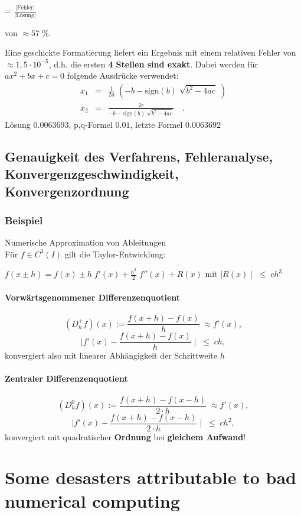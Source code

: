 { = $\frac{|\mbox{Fehler}|}{|\mbox{Lösung}|}$}

von        $\approx 57 \; \%$.

Eine geschickte Formatierung liefert ein Ergebnis mit einem
relativen Fehler von $\approx 1,5 \cdot 10^{-5}$,
d.h. die ersten \textbf{4 Stellen sind exakt}. 
Dabei werden für $ax^2 + bx + c = 0$ folgende Ausdrücke verwendet:
\begin{align*}
  x_1 &=& \tfrac{1}{2a} \; (- b - \mbox{sign}(b) \; \sqrt{b^2 -
          4ac}\;)\\
  x_2& =  &\tfrac{2c}{- b - \mbox{sign}(b) \; \sqrt{b^2 - 4ac}} \quad .
\end{align*}
Lösung $0.0063693$, p,q-Formel $0.01$,
letzte Formel $0.0063692$

\subsection*{Genauigkeit des Verfahrens, Fehleranalyse,
  Konvergenzgeschwindigkeit, Konvergenzordnung}

\subsubsection{Beispiel}
Numerische Approximation von Ableitungen \\
Für $f \in C^3(I)$ gilt die Taylor-Entwicklung:

$f(x \pm h) = f(x) \pm h \; f'(x) + \frac{h^2}{2} \; f''(x) +
R(x)$ mit $\mid R(x) \mid \; \leq \; c   h^3$

\paragraph{Vorwärtsgenommener Differenzenquotient}
$$ (D_h^+f)(x):= \frac{f(x + h) - f(x)}{h} \; \approx f'(x), $$
$$\mid f'(x) - \frac{f(x + h) - f(x)}{h} \mid \; \leq \; c h, $$
konvergiert also mit linearer Abhängigkeit der
Schrittweite $h$  
\paragraph{Zentraler Differenzenquotient}
$$(D_h^0f) (x):= \frac{f(x + h) - f(x-h)}{2 \cdot h} \; \approx
f'(x),$$
$$\mid f'(x) - \frac{f(x + h) - f(x - h)}{2 \cdot h} \mid \;
\leq \; c h^2, $$
konvergiert mit quadratischer \textbf{Ordnung} bei
\textbf{gleichem Aufwand}!


\section*{Some desasters attributable to bad numerical computing}

